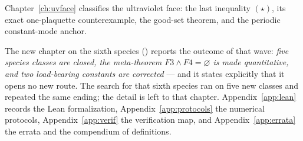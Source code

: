 Chapter~\ref{ch:uvface} classifies the ultraviolet face: the last inequality $(\star)$, its exact
one-plaquette counterexample, the good-set theorem, and the periodic constant-mode anchor.

The new chapter on the sixth species () reports the outcome of that
wave: \emph{five species classes are closed, the meta-theorem $F3\wedge F4=\varnothing$ is made
quantitative, and two load-bearing constants are corrected} --- and it states explicitly that it
opens no new route.
The search for that sixth species ran on five new classes and repeated the same ending; the detail
is left to that chapter.
Appendix~\ref{app:lean} records the Lean formalization, Appendix~\ref{app:protocols} the
numerical protocols, Appendix~\ref{app:verif} the verification map, and
Appendix~\ref{app:errata} the errata and the compendium of definitions.
